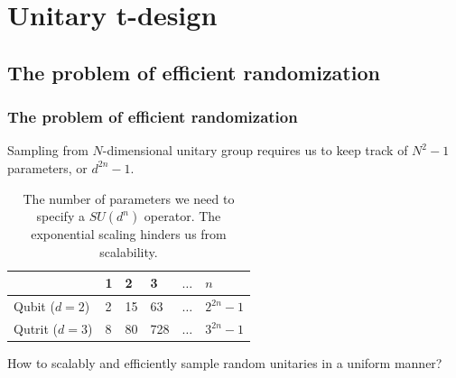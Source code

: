 \documentclass{beamer}
\begin{document}
\section{Unitary t-design}
\subsection{The problem of efficient randomization} 
\begin{frame}
  \frametitle{The problem of efficient randomization}
  Sampling from $N$-dimensional unitary group requires us to keep track of $N^2-1$ parameters, or $d^{2n}-1$.
  \begin{table}[]
    \begin{tabular}{|l|l|l|l|l|l|}
    \hline
                   & 1 & 2  & 3   & $\dots$ & $n$        \\ \hline
    Qubit ($d=2$)  & 2 & 15 & 63  & $\dots$ & $2^{2n}-1$ \\ \hline
    Qutrit ($d=3$) & 8 & 80 & 728 & $\dots$ & $3^{2n}-1$ \\ \hline
    \end{tabular}
    \caption{The number of parameters we need to specify a $SU(d^n)$ operator. The exponential scaling hinders us from scalability.}
    \end{table}
    \begin{problem}
      How to scalably and efficiently sample random unitaries in a uniform manner? 
    \end{problem}
\end{frame}
\end{document}
